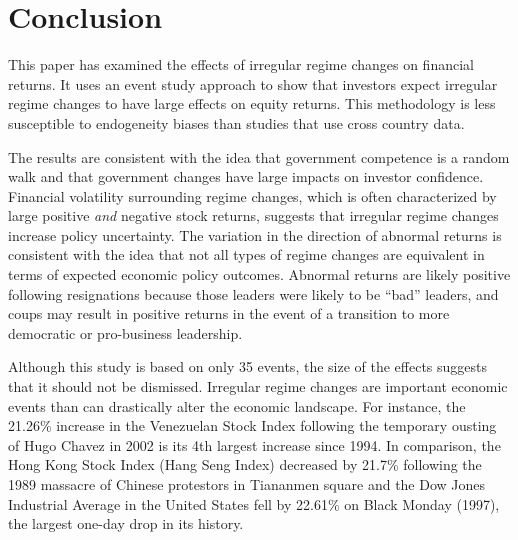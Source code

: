 \documentclass[12pt,final,fleqn]{article}
\theoremstyle{plain}
\begin{document}
\section{Conclusion}
This paper has examined the effects of irregular regime changes on financial returns. It uses an event study approach to show that investors expect irregular regime changes to have large effects on equity returns. This methodology is less susceptible to endogeneity biases than studies that use cross country data.

The results are consistent with the idea that government competence is a random walk and that government changes have large impacts on investor confidence. Financial volatility surrounding regime changes, which is often characterized by large positive \textit{and} negative stock returns, suggests that irregular regime changes increase policy uncertainty. The variation in the direction of abnormal returns is consistent with the idea that not all types of regime changes are equivalent in terms of expected economic policy outcomes. Abnormal returns are likely positive following resignations because those leaders were likely to be ``bad'' leaders, and coups may result in positive returns in the event of a transition to more democratic or pro-business leadership.

Although this study is based on only 35 events, the size of the effects suggests that it should not be dismissed. Irregular regime changes are important economic events than can drastically alter the economic landscape. For instance, the 21.26\% increase in the Venezuelan Stock Index following the temporary ousting of Hugo Chavez in 2002 is its 4th largest increase since 1994. In comparison, the Hong Kong Stock Index (Hang Seng Index) decreased by 21.7\% following the 1989 massacre of Chinese protestors in Tiananmen square and the Dow Jones Industrial Average in the United States fell by 22.61\% on Black Monday (1997), the largest one-day drop in its history.

\appendix
\setcounter{table}{0}
\renewcommand\thetable{\Alph{section}.\arabic{table}}
\end{document}
